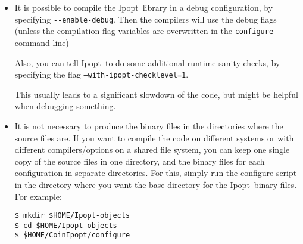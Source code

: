 \documentclass[10pt]{article}
\newcommand{\Ipopt}{{\sc Ipopt}}
\begin{document}
\begin{itemize}
\item It is possible to compile the \Ipopt\ library in a debug
  configuration, by specifying \verb|--enable-debug|.  Then the
  compilers will use the debug flags (unless the compilation flag
  variables are overwritten in the {\tt configure} command line)

  Also, you can tell \Ipopt\ to do some additional runtime sanity
  checks, by specifying the flag {\tt --with-ipopt-checklevel=1}.

  This usually leads to a significant slowdown of the code, but might
  be helpful when debugging something.

\item It is not necessary to produce the binary files in the
  directories where the source files are.  If you want to compile the
  code on different systems or with different compilers/options on a
  shared file system, you can keep one single copy of the source files
  in one directory, and the binary files for each configuration in
  separate directories.  For this, simply run the configure script in
  the directory where you want the base directory for the \Ipopt\
  binary files.  For example:

  {\tt \$ mkdir \$HOME/Ipopt-objects}\\
  {\tt \$ cd \$HOME/Ipopt-objects}\\
  {\tt \$ \$HOME/CoinIpopt/configure}

\end{itemize}

%
%

\end{document}
